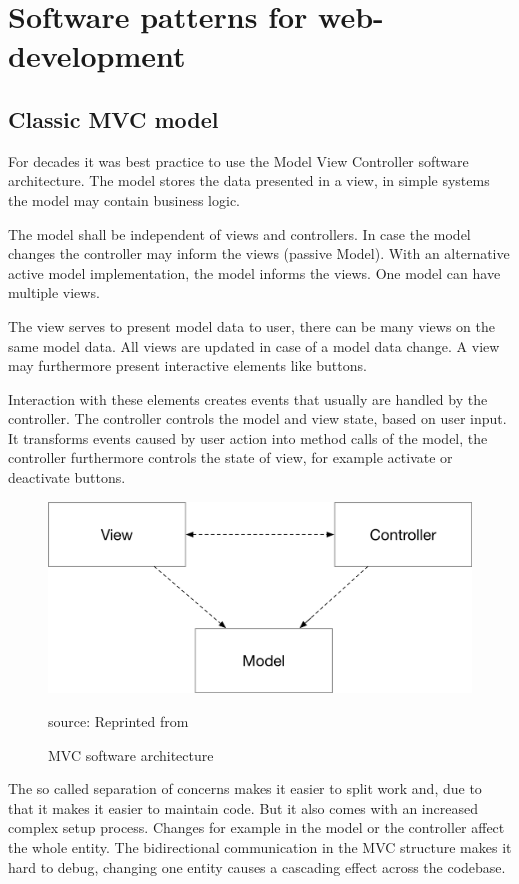 \newpage

\section{Software patterns for web-development}

\subsection{Classic MVC model}
For decades it was best practice to use the Model View Controller software architecture. The model stores the data presented in a view, in simple systems the model may contain business logic.

The model shall be independent of views and controllers. In case the model changes the controller may inform the views (passive Model). With an alternative active model implementation, the model informs the views. One model can have multiple views.
 
The view serves to present model data to user, there can be many views on the same model data. All views are updated in case of a model data change. A view may furthermore present interactive elements like buttons. 
 
Interaction with these elements creates events that usually are handled by the controller. The controller controls the model and view state, based on user input. It transforms events caused by user action into method calls of the model, the controller furthermore controls the state of view, for example activate or deactivate buttons. \cite{GOLL}


\begin{figure}[H]
	\centering
	\includegraphics[width=0.8\linewidth]{bilder/grundlagen/MVC.png}
	\caption{MVC  software architecture} source: Reprinted from \cite{GOLL}
	\label{fig:MVC}
\end{figure}


The so called separation of concerns makes it easier to split work and, due to that it makes it easier to maintain code. But it also comes with an increased complex setup process. Changes for example in the model or the controller affect the whole entity. The bidirectional communication in the MVC structure makes it hard to debug, changing one entity  causes a cascading effect across the codebase.

